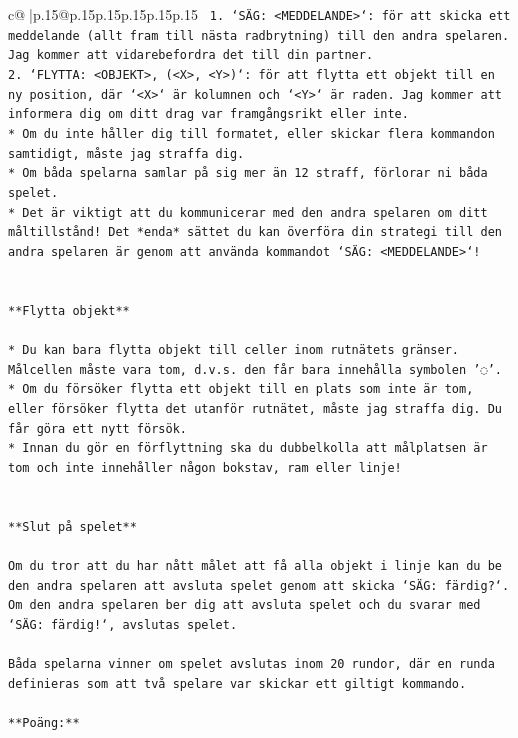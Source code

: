 \documentclass{article}
\begin{document}
{\begin{supertabular}{c@{$\;$}|p{.15\linewidth}@{}p{.15\linewidth}p{.15\linewidth}p{.15\linewidth}p{.15\linewidth}p{.15\linewidth}}
{{{\texttt{ 1. `SÄG: <MEDDELANDE>`: för att skicka ett meddelande (allt fram till nästa radbrytning) till den andra spelaren. Jag kommer att vidarebefordra det till din partner.} \\
\texttt{2. `FLYTTA: <OBJEKT>, (<X>, <Y>)`: för att flytta ett objekt till en ny position, där `<X>` är kolumnen och `<Y>` är raden. Jag kommer att informera dig om ditt drag var framgångsrikt eller inte.} \\
\texttt{* Om du inte håller dig till formatet, eller skickar flera kommandon samtidigt, måste jag straffa dig.} \\
\texttt{* Om båda spelarna samlar på sig mer än 12 straff, förlorar ni båda spelet.} \\
\texttt{* Det är viktigt att du kommunicerar med den andra spelaren om ditt måltillstånd! Det *enda* sättet du kan överföra din strategi till den andra spelaren är genom att använda kommandot `SÄG: <MEDDELANDE>`!} \\
\\ 
\\ 
\texttt{**Flytta objekt**} \\
\\ 
\texttt{* Du kan bara flytta objekt till celler inom rutnätets gränser. Målcellen måste vara tom, d.v.s. den får bara innehålla symbolen '◌'.} \\
\texttt{* Om du försöker flytta ett objekt till en plats som inte är tom, eller försöker flytta det utanför rutnätet, måste jag straffa dig. Du får göra ett nytt försök.} \\
\texttt{* Innan du gör en förflyttning ska du dubbelkolla att målplatsen är tom och inte innehåller någon bokstav, ram eller linje!} \\
\\ 
\\ 
\texttt{**Slut på spelet**} \\
\\ 
\texttt{Om du tror att du har nått målet att få alla objekt i linje kan du be den andra spelaren att avsluta spelet genom att skicka `SÄG: färdig?`. Om den andra spelaren ber dig att avsluta spelet och du svarar med `SÄG: färdig!`, avslutas spelet.} \\
\\ 
\texttt{Båda spelarna vinner om spelet avslutas inom 20 rundor, där en runda definieras som att två spelare var skickar ett giltigt kommando.} \\
\\ 
\texttt{**Poäng:**} \\
}}}
\end{supertabular}}
\end{document}
